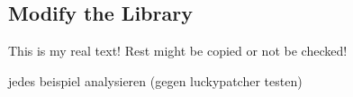 \subsection{Modify the Library} \label{subsection:evaluation-modifications-library}
This is my real text! Rest might be copied or not be checked!

jedes beispiel analysieren (gegen luckypatcher testen)
